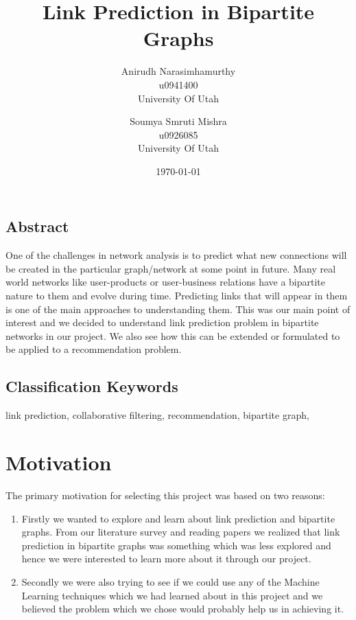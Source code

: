 \documentclass[letterpaper,twocolumn,11pt]{article}
\begin{document}
\date{\today}

\title{\Large \bf  Link Prediction in Bipartite Graphs}

\author{
{\rm Anirudh Narasimhamurthy}\\
u0941400\\ 
University Of Utah
\and
{\rm Soumya Smruti Mishra}\\
u0926085\\ 
University Of Utah
} %

\maketitle


\thispagestyle{empty}

\subsection*{Abstract}
One of the challenges in network analysis is to predict what new connections will be created in the particular graph/network at some point in future. Many real world networks like user-products or user-business relations have a bipartite nature to them and evolve during time. Predicting links that will appear in them is one of the main approaches to understanding them. This was our main point of interest and we decided to understand link prediction problem in bipartite networks in our project. We also see how this can be extended or formulated to be applied to a recommendation problem. 


\subsection*{Classification Keywords}
link prediction, collaborative filtering, recommendation, bipartite graph,


\section{Motivation}
The primary motivation for selecting this project was based on two reasons: 
\begin{enumerate}
\item Firstly we wanted to explore and learn about link prediction and bipartite graphs. From our literature survey and reading papers \cite{two} \cite{six} \cite{seven} \cite{eight} we realized that link prediction in bipartite graphs was something which was less explored and hence we were interested to learn more about it through our project. 
\item Secondly we were also trying to see if we could use any of the Machine Learning techniques which we had learned about in this project and we believed the problem which we chose would probably help us in achieving it. 
\end{enumerate}
\end{document}
